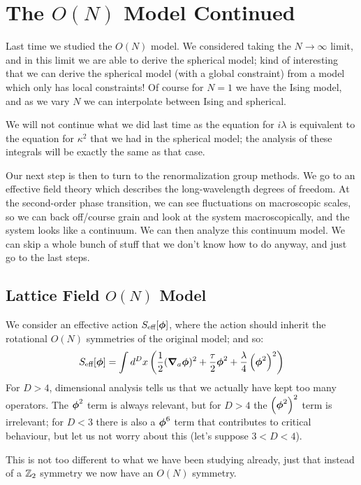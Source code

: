 \section{The $O(N)$ Model Continued}
Last time we studied the $O(N)$ model. We considered taking the $N \to \infty$ limit, and in this limit we are able to derive the spherical model; kind of interesting that we can derive the spherical model (with a global constraint) from a model which only has local constraints! Of course for $N = 1$ we have the Ising model, and as we vary $N$ we can interpolate between Ising and spherical.

We will not continue what we did last time as the equation for $i\lambda$ is equivalent to the equation for $\kappa^2$ that we had in the spherical model; the analysis of these integrals will be exactly the same as that case.

Our next step is then to turn to the renormalization group methods. We go to an effective field theory which describes the long-wavelength degrees of freedom. At the second-order phase transition, we can see fluctuations on macroscopic scales, so we can back off/course grain and look at the system macroscopically, and the system looks like a continuum. We can then analyze this continuum model. We can skip a whole bunch of stuff that we don't know how to do anyway, and just go to the last steps.

\subsection{Lattice Field $O(N)$ Model}
We consider an effective action $S_{\text{eff}}[\gv{\phi}]$, where the action should inherit the rotational $O(N)$ symmetries of the original model; and so:
\begin{equation}
    S_{\text{eff}}[\gv{\phi}] = \int d^Dx \left(\frac{1}{2}(\nabla_a \gv{\phi})^2 + \frac{\tau}{2}\gv{\phi}^2 + \frac{\lambda}{4}\left(\gv{\phi}^2\right)^2\right)
\end{equation}
For $D > 4$, dimensional analysis tells us that we actually have kept too many operators. The $\gv{\phi}^2$ term is always relevant, but for $D > 4$ the $\left(\gv{\phi}^2\right)^2$ term is irrelevant; for $D < 3$ there is also a $\gv{\phi}^6$ term that contributes to critical behaviour, but let us not worry about this (let's suppose $3 < D < 4$). 

This is not too different to what we have been studying already, just that instead of a $\mathbb{Z}_2$ symmetry we now have an $O(N)$ symmetry.

